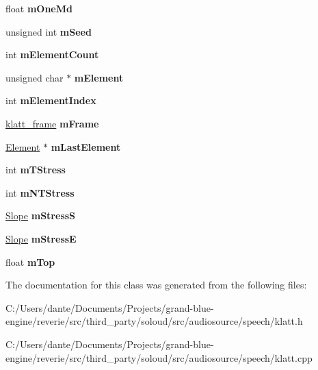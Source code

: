 \begin{DoxyCompactItemize}
\mbox{\label{classklatt_a49158cd4c61920a934425729e8cd9700}} 
float {\bfseries m\+One\+Md}
\item 
\mbox{\label{classklatt_a2fae23b3a459890bfc2799e88dd555d0}} 
unsigned int {\bfseries m\+Seed}
\item 
\mbox{\label{classklatt_a34a0f27ed56fd599ebe965177bd14171}} 
int {\bfseries m\+Element\+Count}
\item 
\mbox{\label{classklatt_a79f5bb2261e88de6677fc0350faf1f3d}} 
unsigned char $\ast$ {\bfseries m\+Element}
\item 
\mbox{\label{classklatt_a3835834ff6205aba7b2b7a77326f5fe7}} 
int {\bfseries m\+Element\+Index}
\item 
\mbox{\label{classklatt_adadfe42b4c1fd6c98832661cc21eb6d4}} 
\mbox{\hyperlink{classklatt__frame}{klatt\+\_\+frame}} {\bfseries m\+Frame}
\item 
\mbox{\label{classklatt_a2af78e41b917f1b75a9f3ef625469123}} 
\mbox{\hyperlink{class_element}{Element}} $\ast$ {\bfseries m\+Last\+Element}
\item 
\mbox{\label{classklatt_a65f42b5b6a80fd280282c08e8cdf36e8}} 
int {\bfseries m\+T\+Stress}
\item 
\mbox{\label{classklatt_a2b6f55e75ebdf09b250385103592beaa}} 
int {\bfseries m\+N\+T\+Stress}
\item 
\mbox{\label{classklatt_a0499c55e0101f175dd7fb22d9b639e60}} 
\mbox{\hyperlink{class_slope}{Slope}} {\bfseries m\+StressS}
\item 
\mbox{\label{classklatt_a965a480d9665360f24c9c89ad2b8d3bf}} 
\mbox{\hyperlink{class_slope}{Slope}} {\bfseries m\+StressE}
\item 
\mbox{\label{classklatt_a9559384f801d9f8782333f092f739a69}} 
float {\bfseries m\+Top}
\end{DoxyCompactItemize}


The documentation for this class was generated from the following files\+:\begin{DoxyCompactItemize}
\item 
C\+:/\+Users/dante/\+Documents/\+Projects/grand-\/blue-\/engine/reverie/src/third\+\_\+party/soloud/src/audiosource/speech/klatt.\+h\item 
C\+:/\+Users/dante/\+Documents/\+Projects/grand-\/blue-\/engine/reverie/src/third\+\_\+party/soloud/src/audiosource/speech/klatt.\+cpp\end{DoxyCompactItemize}
